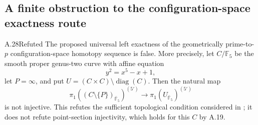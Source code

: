 \subsection{A finite obstruction to the configuration-space exactness route}

\begin{claim}{A.28}{Refuted}
The proposed universal left exactness of the geometrically prime-to-$p$
configuration-space homotopy sequence is false. More precisely, let
$C/\mathbb F_5$ be the smooth proper genus-two curve with affine equation
\[
 y^2=x^5-x+1,
\]
let $P=\infty$, and put $U=(C\times C)\setminus\operatorname{diag}(C)$.
Then the natural map
\[
 \pi_1((C\setminus\{P\})_{\overline{\mathbb F}_5})^{(5')}
 \longrightarrow \pi_1(U_{\overline{\mathbb F}_5})^{(5')}
\]
is not injective. This refutes the sufficient topological condition
considered in \citet[Remark 3.13]{A_SaidiTamagawa2009}; it does not
refute point-section injectivity, which holds for this $C$ by A.19.
\end{claim}
